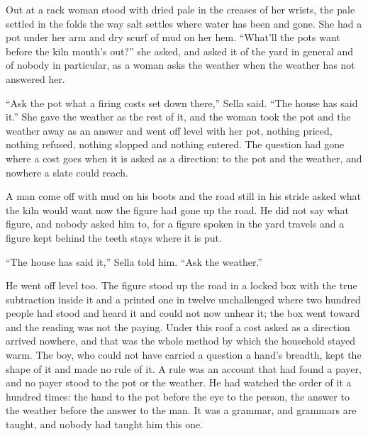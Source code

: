 \scenebreak

Out at  a rack woman stood with  dried pale in the creases of her wrists, the pale settled in the folds the way salt settles where water has been and gone. She had a pot under her arm and dry scurf of mud on her hem. “What'll the pots want before the kiln month's out?” she asked, and asked it of the yard in general and of nobody in particular, as a woman asks the weather when the weather has not answered her.

“Ask the pot what a firing costs set down there,” Sella said. “The house has said it.” She gave the weather as the rest of it, and the woman took the pot and the weather away as an answer and went off level with her pot, nothing priced, nothing refused, nothing slopped and nothing entered. The question had gone where a cost goes when it is asked as a direction: to the pot and the weather, and nowhere a slate could reach.

A man come off  with mud on his boots and the road still in his stride asked what the kiln would want now the figure had gone up the road. He did not say what figure, and nobody asked him to, for a figure spoken in the yard travels and a figure kept behind the teeth stays where it is put.

“The house has said it,” Sella told him. “Ask the weather.”

He went off level too. The figure stood up the road in a locked box with the true subtraction inside it and a printed one in twelve unchallenged where two hundred people had stood and heard it and could not now unhear it; the box went toward  and the reading was not the paying. Under this roof a cost asked as a direction arrived nowhere, and that was the whole method by which the household stayed warm. The boy, who could not have carried a question a hand's breadth, kept the shape of it and made no rule of it. A rule was an account that had found a payer, and no payer stood to the pot or the weather. He had watched the order of it a hundred times: the hand to the pot before the eye to the person, the answer to the weather before the answer to the man. It was a grammar, and grammars are taught, and nobody had taught him this one.

\scenebreak

